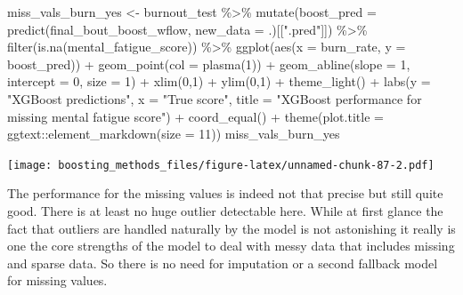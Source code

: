 \documentclass[
]{book}
\newenvironment{Shaded}{\begin{snugshade}}{\end{snugshade}}
\newcommand{\AttributeTok}[1]{\textcolor[rgb]{0.77,0.63,0.00}{#1}}
\newcommand{\DecValTok}[1]{\textcolor[rgb]{0.00,0.00,0.81}{#1}}
\newcommand{\FunctionTok}[1]{\textcolor[rgb]{0.00,0.00,0.00}{#1}}
\newcommand{\NormalTok}[1]{#1}
\newcommand{\OtherTok}[1]{\textcolor[rgb]{0.56,0.35,0.01}{#1}}
\newcommand{\SpecialCharTok}[1]{\textcolor[rgb]{0.00,0.00,0.00}{#1}}
\newcommand{\StringTok}[1]{\textcolor[rgb]{0.31,0.60,0.02}{#1}}
\begin{document}
\begin{Shaded}
\begin{Highlighting}[]
\NormalTok{miss\_vals\_burn\_yes }\OtherTok{\textless{}{-}}\NormalTok{ burnout\_test }\SpecialCharTok{\%\textgreater{}\%}
  \FunctionTok{mutate}\NormalTok{(}\AttributeTok{boost\_pred =} \FunctionTok{predict}\NormalTok{(final\_bout\_boost\_wflow,}
                              \AttributeTok{new\_data =}\NormalTok{ .)[[}\StringTok{".pred"}\NormalTok{]]) }\SpecialCharTok{\%\textgreater{}\%}
  \FunctionTok{filter}\NormalTok{(}\FunctionTok{is.na}\NormalTok{(mental\_fatigue\_score)) }\SpecialCharTok{\%\textgreater{}\%}
  \FunctionTok{ggplot}\NormalTok{(}\FunctionTok{aes}\NormalTok{(}\AttributeTok{x =}\NormalTok{ burn\_rate, }\AttributeTok{y =}\NormalTok{ boost\_pred)) }\SpecialCharTok{+}
  \FunctionTok{geom\_point}\NormalTok{(}\AttributeTok{col =} \FunctionTok{plasma}\NormalTok{(}\DecValTok{1}\NormalTok{)) }\SpecialCharTok{+} 
  \FunctionTok{geom\_abline}\NormalTok{(}\AttributeTok{slope =} \DecValTok{1}\NormalTok{, }\AttributeTok{intercept =} \DecValTok{0}\NormalTok{, }\AttributeTok{size =} \DecValTok{1}\NormalTok{) }\SpecialCharTok{+}
  \FunctionTok{xlim}\NormalTok{(}\DecValTok{0}\NormalTok{,}\DecValTok{1}\NormalTok{) }\SpecialCharTok{+} \FunctionTok{ylim}\NormalTok{(}\DecValTok{0}\NormalTok{,}\DecValTok{1}\NormalTok{) }\SpecialCharTok{+}
  \FunctionTok{theme\_light}\NormalTok{() }\SpecialCharTok{+}
  \FunctionTok{labs}\NormalTok{(}\AttributeTok{y =} \StringTok{"XGBoost predictions"}\NormalTok{,}
       \AttributeTok{x =} \StringTok{"True score"}\NormalTok{,}
       \AttributeTok{title =} \StringTok{"XGBoost performance for missing mental fatigue score"}\NormalTok{) }\SpecialCharTok{+}
  \FunctionTok{coord\_equal}\NormalTok{() }\SpecialCharTok{+}
  \FunctionTok{theme}\NormalTok{(}\AttributeTok{plot.title =}\NormalTok{ ggtext}\SpecialCharTok{::}\FunctionTok{element\_markdown}\NormalTok{(}\AttributeTok{size =} \DecValTok{11}\NormalTok{))}
\NormalTok{miss\_vals\_burn\_yes}
\end{Highlighting}
\end{Shaded}

\texttt{[image: boosting\_methods\_files/figure-latex/unnamed-chunk-87-2.pdf]}

The performance for the missing values is indeed not that precise but still quite good. There is at least no huge outlier detectable here. While at first glance the fact that outliers are handled naturally by the model is not astonishing it really is one the core strengths of the model to deal with messy data that includes missing and sparse data. So there is no need for imputation or a second fallback model for missing values.
\end{document}
